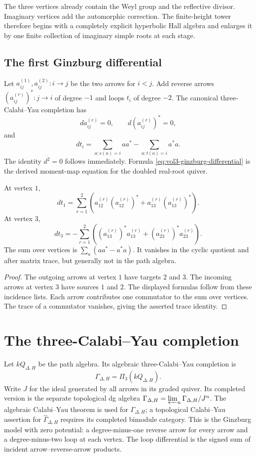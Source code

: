 The three vertices already contain the Weyl group and the reflective divisor.  Imaginary vertices add the automorphic correction.  The finite-height tower therefore begins with a completely explicit hyperbolic Hall algebra and enlarges it by one finite collection of imaginary simple roots at each stage.

\subsection{The first Ginzburg differential}
Let $a_{ij}^{(1)},a_{ij}^{(2)}:i\to j$ be the two arrows for $i<j$.  Add reverse arrows $(a_{ij}^{(r)})^*:j\to i$ of degree $-1$ and loops $t_i$ of degree $-2$.  The canonical three-Calabi--Yau completion has
\[
 d a_{ij}^{(r)}=0,
 \qquad
 d(a_{ij}^{(r)})^*=0,
\]
and
\begin{equation}\label{eq:vol3-ginzburg-differential}
 d t_i=
 \sum_{a:s(a)=i}aa^*
 -\sum_{a:t(a)=i}a^*a.
\end{equation}
The identity $d^2=0$ follows immediately.  Formula \eqref{eq:vol3-ginzburg-differential} is the derived moment-map equation for the doubled real-root quiver.

\begin{calculation}
At vertex $1$,
\[
 d t_1=
 \sum_{r=1}^2
 \left(
 a_{12}^{(r)}(a_{12}^{(r)})^*
 +a_{13}^{(r)}(a_{13}^{(r)})^*
 \right).
\]
At vertex $3$,
\[
 d t_3=-\sum_{r=1}^2\left(
 (a_{13}^{(r)})^*a_{13}^{(r)}+
 (a_{23}^{(r)})^*a_{23}^{(r)}\right).
\]
The sum over vertices is $\sum_a(aa^*-a^*a)$.
It vanishes in the cyclic quotient and after matrix trace,
but generally not in the path algebra.
\end{calculation}
\begin{proof}
The outgoing arrows at vertex $1$ have targets $2$ and $3$.
The incoming arrows at vertex $3$ have sources $1$ and $2$.
The displayed formulas follow from these incidence lists.
Each arrow contributes one commutator to the sum over vertices.
The trace of a commutator vanishes, giving the asserted trace identity.
\end{proof}


\section{The three-Calabi--Yau completion}
Let $kQ_{\Delta,H}$ be the path algebra. Its algebraic
three-Calabi--Yau completion is
\[
 \Gamma_{\Delta,H}=\Pi_3(kQ_{\Delta,H}).
\]
Write $J$ for the ideal generated by all arrows in its graded quiver.
Its completed version is the separate topological dg algebra
$\widehat\Gamma_{\Delta,H}=\varprojlim_n\Gamma_{\Delta,H}/J^n$.
The algebraic Calabi--Yau theorem is used for $\Gamma_{\Delta,H}$;
a topological Calabi--Yau assertion for $\widehat\Gamma_{\Delta,H}$
requires its completed bimodule category.
This is the Ginzburg model with zero potential: a degree-minus-one
reverse arrow for every arrow and a degree-minus-two loop at each
vertex. The loop differential is the signed sum of incident
arrow--reverse-arrow products.

